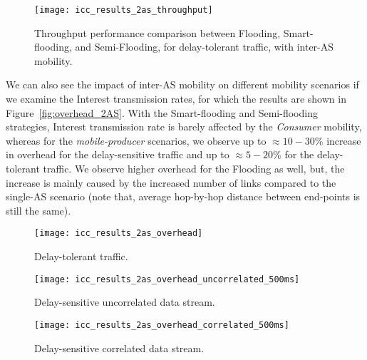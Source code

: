 \documentclass[conference]{IEEEtran}
\begin{document}
\begin{figure}[htb]
  \centering
\texttt{[image: icc\_results\_2as\_throughput]}\\
  \caption{Throughput performance comparison between Flooding, Smart-flooding, and Semi-Flooding, for delay-tolerant traffic, with inter-AS mobility.}\label{ThroughputResults2AS}
\end{figure}


We can also see the impact of inter-AS mobility on different mobility scenarios if we examine the Interest transmission rates, for which the results are shown in Figure~\ref{fig:overhead_2AS}. With the Smart-flooding and Semi-flooding strategies, Interest transmission rate is barely affected by the \emph{Consumer} mobility, whereas for the \emph{mobile-producer} scenarios, we observe up to $\approx 10-30\%$ increase in overhead for the delay-sensitive traffic and up to $\approx 5-20\%$ for the delay-tolerant traffic. We observe higher overhead for the Flooding as well, but, the increase is mainly caused by the increased number of links compared to the single-AS scenario (note that, average hop-by-hop distance between end-points is still the same).
\begin{figure*}
        \centering
        \hspace{-0.15in}
          \begin{subfigure}[b]{0.3\textwidth}\centering
                \texttt{[image: icc\_results\_2as\_overhead]}\\
                \caption{Delay-tolerant traffic.}
                \label{DataOverhead2AS}
        \end{subfigure}
        \hspace{0.05in}
        \begin{subfigure}[b]{0.3\textwidth}\centering
               \texttt{[image: icc\_results\_2as\_overhead\_uncorrelated\_500ms]}\\
               \caption{Delay-sensitive uncorrelated data stream.}
               \label{UncorrelatedOverhead2AS}
        \end{subfigure}
        \hspace{0.05in}
        \begin{subfigure}[b]{0.3\textwidth}\centering
                \texttt{[image: icc\_results\_2as\_overhead\_correlated\_500ms]}\\
                \caption{Delay-sensitive correlated data stream.}
                \label{CorrelatedOverhead2AS}
        \end{subfigure}
        \caption{Average number of Interest messages transmitted per successfully received Data packet with inter-AS mobility ($\delta=500ms$ for delay-sensitive scenario).}\label{fig:overhead_2AS}
\end{figure*}
\end{document}
